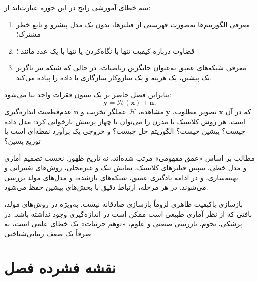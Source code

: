 \documentclass[12pt,openany,oneside]{book}
\newcommand{\vect}[1]{\bm{#1}}
\newcommand{\op}[1]{\mathcal{#1}}
\begin{document}
سه خطای آموزشی رایج در این حوزه عبارت‌اند از:
\begin{enumerate}
\item معرفی الگوریتم‌ها به‌صورت فهرستی از فیلترها، بدون یک مدل پیشرو و تابع خطر مشترک؛
\item قضاوت درباره کیفیت تنها با نگاه‌کردن یا تنها با یک عدد مانند ؛
\item معرفی شبکه‌های عمیق به‌عنوان جایگزین ریاضیات، در حالی که شبکه نیز ناگزیر یک پیشین، یک هزینه و یک سازوکار سازگاری با داده را پیاده می‌کند.
\end{enumerate}

بنابراین فصل حاضر بر یک ستون فقرات واحد بنا می‌شود:
\begin{equation}
\vect y=\op H(\vect x)+\vect n,
\label{eq:master-forward-front}
\end{equation}
که در آن \(\vect x\) تصویر مطلوب، \(\vect y\) مشاهده، \(\op H\) عملگر تخریب و \(\vect n\) عدم‌قطعیت اندازه‌گیری است.
هر روش کلاسیک یا مدرن را می‌توان با چهار پرسش بازخوانی کرد: مدل داده چیست؟ پیشین چیست؟ الگوریتم حل چیست؟
و خروجی یک برآورد نقطه‌ای است یا توزیع پسین؟

\begin{keybox}
مطالب بر اساس «عمق مفهومی» مرتب شده‌اند، نه تاریخ ظهور. نخست تصمیم آماری و مدل خطی، سپس فیلترهای کلاسیک،
نمایش تنک و غیرمحلی، روش‌های تغییراتی و بهینه‌سازی، و در ادامه یادگیری عمیق، شبکه‌های بازشده،
 و مدل‌های مولد بررسی می‌شوند. در هر مرحله، ارتباط دقیق با بخش‌های پیشین حفظ می‌شود.
\end{keybox}

\begin{warningbox}
بازسازی باکیفیت ظاهری لزوماً بازسازی صادقانه نیست. به‌ویژه در روش‌های مولد، بافتی که از نظر آماری طبیعی است
ممکن است در اندازه‌گیری وجود نداشته باشد. در پزشکی، نجوم، بازرسی صنعتی و علوم، «توهم جزئیات» یک خطای علمی است،
نه صرفاً یک ضعف زیبایی‌شناختی.
\end{warningbox}

\chapter*{نقشه فشرده فصل}
\end{document}
